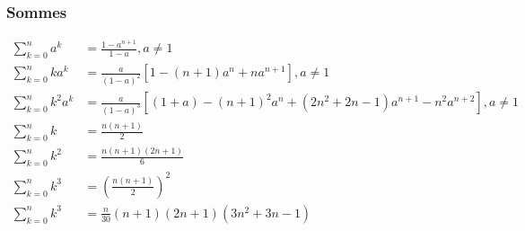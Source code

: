 \documentclass[8pt]{article}
\begin{document}
                \subsubsection{Sommes}
                \begin{align}
                    \sum_{k=0}^n a^k &= \frac{1-a^{n+1}}{1-a}, a \ne 1\\
                    \sum_{k=0}^n ka^k &= \frac{a}{(1-a)^2}[1-(n+1)a^n + na^{n+1}] , a\ne 1\\
                    \sum_{k=0}^n k^2a^k &= \frac{a}{(1-a)^3}[(1+a)-(n+1)^2a^n+(2n^2+2n-1)a^{n+1}-n^2a^{n+2}], a\ne 1\\
                    \sum_{k=0}^{n} k &= \frac{n(n+1)}{2}\\
                    \sum_{k=0}^{n} k^2 &= \frac{n(n+1)(2n+1)}{6}\\
                    \sum_{k=0}^{n} k^3 &= \left(\frac{n(n+1)}{2}\right)^2\\
                    \sum_{k=0}^{n} k^3 &= \frac{n}{30}(n+1)(2n+1)(3n^2+3n-1)
                \end{align}
\end{document}
